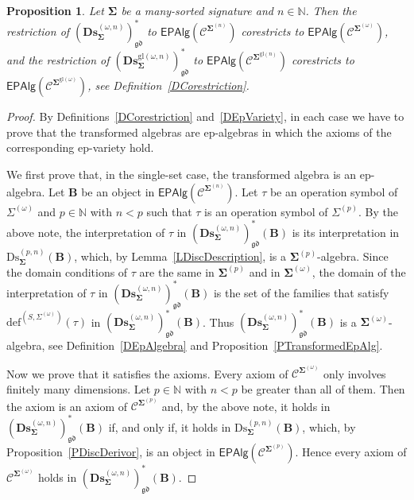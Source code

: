 \documentclass[a4paper, reqno
]{amsart}
\newcommand{\sig}[1]{\mathbf{#1}}             %
\newcommand{\spec}[1]{\boldsymbol{\mathcal{#1}}} %
\newcommand{\gd}{\mathfrak{gd}}              %
\newcommand{\gl}{\mathrm{gl}}                %
\newcommand{\Ds}{\mathrm{Ds}}
\newcommand{\bDs}{\mathbf{Ds}}
\theoremstyle{plain}
\newtheorem{proposition}[theorem]{Proposition}
\theoremstyle{definition}
\begin{document}
\begin{proposition}\label{PDiscOmegaDerivor}
Let $\sig{\Sigma}$ be a many-sorted signature and $n\in\mathbb{N}$.
Then the restriction of $(\bDs^{(\omega,n)}_{\sig{\Sigma}})^{\ast}_{\gd}$ to $\mathsf{EPAlg}(\spec{C}^{\sig{\Sigma}^{(n)}})$ corestricts to $\mathsf{EPAlg}(\spec{C}^{\sig{\Sigma}^{(\omega)}})$, and the restriction of $(\bDs^{\gl(\omega,n)}_{\sig{\Sigma}})^{\ast}_{\gd}$ to $\mathsf{EPAlg}(\spec{C}^{\sig{\Sigma}^{\gl(n)}})$ corestricts to $\mathsf{EPAlg}(\spec{C}^{\sig{\Sigma}^{\gl(\omega)}})$, see Definition~\ref{DCorestriction}.
\end{proposition}
\begin{proof}
By Definitions~\ref{DCorestriction} and~\ref{DEpVariety}, in each case we have to prove that the transformed algebras are ep-algebras in which the axioms of the corresponding ep-variety hold.

We first prove that, in the single-set case, the transformed algebra is an ep-algebra.
Let $\mathbf{B}$ be an object in $\mathsf{EPAlg}(\spec{C}^{\sig{\Sigma}^{(n)}})$.
Let $\tau$ be an operation symbol of $\Sigma^{(\omega)}$ and $p\in\mathbb{N}$ with $n<p$ such that $\tau$ is an operation symbol of $\Sigma^{(p)}$.
By the above note, the interpretation of $\tau$ in $(\bDs^{(\omega,n)}_{\sig{\Sigma}})^{\ast}_{\gd}(\mathbf{B})$ is its interpretation in $\Ds^{(p,n)}_{\sig{\Sigma}}(\mathbf{B})$, which, by Lemma~\ref{LDiscDescription}, is a $\sig{\Sigma}^{(p)}$-algebra.
Since the domain conditions of $\tau$ are the same in $\sig{\Sigma}^{(p)}$ and in $\sig{\Sigma}^{(\omega)}$, the domain of the interpretation of $\tau$ in $(\bDs^{(\omega,n)}_{\sig{\Sigma}})^{\ast}_{\gd}(\mathbf{B})$ is the set of the families that satisfy $\mathrm{def}^{(S,\Sigma^{(\omega)})}(\tau)$ in $(\bDs^{(\omega,n)}_{\sig{\Sigma}})^{\ast}_{\gd}(\mathbf{B})$.
Thus $(\bDs^{(\omega,n)}_{\sig{\Sigma}})^{\ast}_{\gd}(\mathbf{B})$ is a $\sig{\Sigma}^{(\omega)}$-algebra, see Definition~\ref{DEpAlgebra} and Proposition~\ref{PTransformedEpAlg}.

Now we prove that it satisfies the axioms.
Every axiom of $\spec{C}^{\sig{\Sigma}^{(\omega)}}$ only involves finitely many dimensions.
Let $p\in\mathbb{N}$ with $n<p$ be greater than all of them.
Then the axiom is an axiom of $\spec{C}^{\sig{\Sigma}^{(p)}}$ and, by the above note, it holds in $(\bDs^{(\omega,n)}_{\sig{\Sigma}})^{\ast}_{\gd}(\mathbf{B})$ if, and only if, it holds in $\Ds^{(p,n)}_{\sig{\Sigma}}(\mathbf{B})$, which, by Proposition~\ref{PDiscDerivor}, is an object in $\mathsf{EPAlg}(\spec{C}^{\sig{\Sigma}^{(p)}})$.
Hence every axiom of $\spec{C}^{\sig{\Sigma}^{(\omega)}}$ holds in $(\bDs^{(\omega,n)}_{\sig{\Sigma}})^{\ast}_{\gd}(\mathbf{B})$.


\end{proof}
\end{document}
